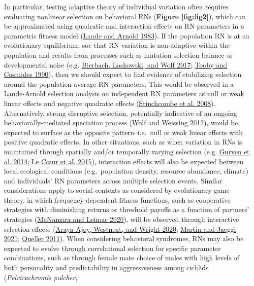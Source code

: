 \documentclass{article}
\begin{document}
In particular, testing adaptive theory of individual variation often
requires evaluating nonlinear selection on behavioral RNs
(\textbf{Figure \ref{fig:fig2}}), which can be approximated using
quadratic and interaction effects on RN parameters in a parametric
fitness model (\protect\hyperlink{ref-Lande1983}{Lande and Arnold
1983}). If the population RN is at an evolutionary equilibrium, soc that
RN variation is non-adaptive within the population and results from
processes such as mutation-selection balance or developmental noise
(e.g. \protect\hyperlink{ref-Bierbach2017}{Bierbach, Laskowski, and Wolf
2017}; \protect\hyperlink{ref-Tooby1990}{Tooby and Cosmides 1990}), then
we should expect to find evidence of stabilizing selection around the
population average RN parameters. This would be observed in a
Lande-Arnold selection analysis on independent RN parameters as null or
weak linear effects and negative quadratic effects
(\protect\hyperlink{ref-Stinch2008}{Stinchcombe et al. 2008}).
Alternatively, strong disruptive selection, potentially indicative of an
ongoing behaviorally-mediated speciation process
(\protect\hyperlink{ref-Wolf2012}{Wolf and Weissing 2012}), would be
expected to surface as the opposite pattern--i.e.~null or weak linear
effects with positive quadratic effects. In other situations, such as
when variation in RNs is maintained through spatially and/or temporally
varying selection (e.g. \protect\hyperlink{ref-Gurven2014}{Gurven et al.
2014}; Le \protect\hyperlink{ref-LC2015}{Cœur et al. 2015}), interaction
effects will also be expected between local ecological conditions
(e.g.~population density, resource abundance, climate) and individuals'
RN parameters across multiple selection events. Similar considerations
apply to social contexts as considered by evolutionary game theory, in
which frequency-dependent fitness functions, such as cooperative
strategies with diminishing returns or threshold payoffs as a function
of partners' strategies (\protect\hyperlink{ref-McNamara2020}{McNamara
and Leimar 2020}), will be observed through interactive selection
effects (\protect\hyperlink{ref-Araya2020}{Araya-Ajoy, Westneat, and
Wright 2020}; \protect\hyperlink{ref-Martin2021}{Martin and Jaeggi
2021}; \protect\hyperlink{ref-Queller2011}{Queller 2011}). When
considering behavioral syndromes, RNs may also be expected to evolve
through correlational selection for specific parameter combinations,
such as through female mate choice of males with high levels of both
personality and predictability in aggressiveness among cichlids
(\emph{Pelvicachromis pulcher},
\end{document}
